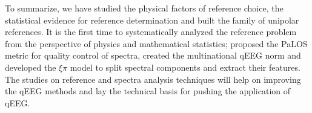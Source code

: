 \begin{englishabstract}
To summarize, we have studied the physical factors of reference choice, the statistical evidence for reference determination and built the family of unipolar references. It is the first time to systematically analyzed the reference problem from the perspective of physics and mathematical statistics; proposed the PaLOS metric for quality control of spectra, created the multinational qEEG norm and developed the $\xi\pi$ model to split spectral components and extract their features. The studies on reference and spectra analysis techniques will help on improving the qEEG methods and lay the technical basis for pushing the application of qEEG.

\end{englishabstract}